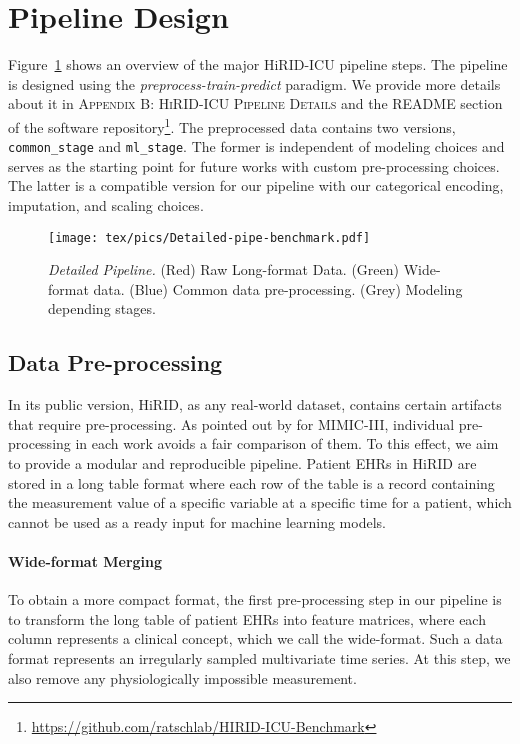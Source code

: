 \documentclass{article}
\begin{document}
\section{Pipeline Design}\label{pipeline}
Figure~\ref{fig:pipeline-detailed} shows an overview of the major HiRID-ICU pipeline steps. The pipeline is designed using the \textit{preprocess-train-predict} paradigm. We provide more details about it in \textsc{Appendix B: HiRID-ICU Pipeline Details}  and the README section of the software repository\footnote{\url{https://github.com/ratschlab/HIRID-ICU-Benchmark}}. The preprocessed data contains two versions, \texttt{common\_stage} and \texttt{ml\_stage}. The former is independent of modeling choices and serves as the starting point for future works with custom pre-processing choices. The latter is a compatible version for our pipeline with our categorical encoding, imputation, and scaling choices.
\begin{figure}[h]
    \centering
    \texttt{[image: tex/pics/Detailed-pipe-benchmark.pdf]}
    \caption{\textit{Detailed Pipeline.} (Red) Raw Long-format Data.  (Green) Wide-format data. (Blue) Common data pre-processing.  (Grey) Modeling depending stages.}
    \label{fig:pipeline-detailed}
\end{figure}

\subsection{Data Pre-processing}
In its public version, HiRID, as any real-world dataset, contains certain artifacts that require pre-processing. As pointed out by \citep{bellamy2020evaluating} for MIMIC-III, individual pre-processing in each work avoids a fair comparison of them. To this effect, we aim to provide a modular and reproducible pipeline.
Patient EHRs in HiRID are stored in a long table format where each row of the table is a record containing the measurement value of a specific variable at a specific time for a patient, which cannot be used as a ready input for machine learning models.

\paragraph{Wide-format Merging}
To obtain a more compact format, the first pre-processing step in our pipeline is to transform the long table of patient EHRs into feature matrices, where each column represents a clinical concept, which we call the wide-format. Such a data format represents an irregularly sampled multivariate time series. At this step, we also remove any physiologically impossible measurement.
\end{document}
